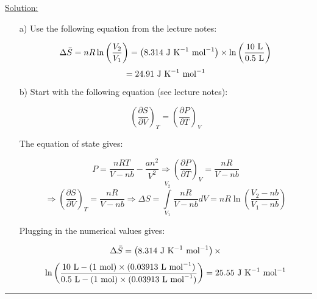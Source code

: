 \noindent
\underline{Solution:}\\

\begin{itemize}

\item[a)] Use the following equation from the lecture notes:

$$\Delta \bar{S} = nR\ln\left(\frac{V_2}{V_1}\right) = \left(8.314\textnormal{ J K}^{-1}\textnormal{ mol}^{-1}\right)\times\ln\left(\frac{10\textnormal{ L}}{0.5\textnormal{ L}}\right)$$
$$ = 24.91\textnormal{ J K}^{-1}\textnormal{ mol}^{-1}$$

\item[b)] Start with the following equation (see lecture notes):

$$\left(\frac{\partial S}{\partial V}\right)_T = \left(\frac{\partial P}{\partial T}\right)_V$$

The equation of state gives:

$$P = \frac{nRT}{V - nb} - \frac{an^2}{V^2} \Rightarrow \left(\frac{\partial P}{\partial T}\right)_V = \frac{nR}{V - nb}$$
$$\Rightarrow \left(\frac{\partial S}{\partial V}\right)_T = \frac{nR}{V - nb} \Rightarrow \Delta S = \int\limits_{V_1}^{V_2}\frac{nR}{V -nb}dV = nR\ln\left(\frac{V_2 - nb}{V_1 - nb}\right)$$

Plugging in the numerical values gives:

$$\Delta \bar{S} = \left(8.314\textnormal{ J K}^{-1}\textnormal{ mol}^{-1}\right)\times$$
$$\ln\left(\frac{10\textnormal{ L} - (1\textnormal{ mol})\times (0.03913\textnormal{ L mol}^{-1})}{0.5\textnormal{ L} - (1\textnormal{ mol})\times (0.03913\textnormal{ L mol}^{-1})}\right) = 25.55\textnormal{ J K}^{-1}\textnormal{ mol}^{-1}$$

\end{itemize}

\hrule\vspace{0.5cm}
